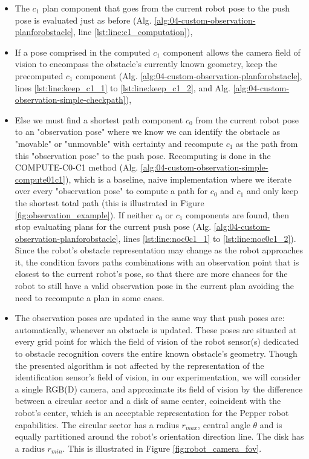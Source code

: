 \begin{itemize}
  \item The $c_{1}$ plan component that goes from the current robot pose to the push pose is evaluated just as before (Alg. \ref{alg:04-custom-observation-planforobstacle}, line \ref{lst:line:c1_computation}),
  \item If a pose comprised in the computed $c_{1}$ component allows the camera field of vision to encompass the obstacle's currently known geometry, keep the precomputed $c_{1}$ component (Alg. \ref{alg:04-custom-observation-planforobstacle}, lines \ref{lst:line:keep_c1_1} to \ref{lst:line:keep_c1_2}, and Alg. \ref{alg:04-custom-observation-simple-checkpath}),
  \item Else we must find a shortest path component $c_{0}$ from the current robot pose to an "observation pose" where we know we can identify the obstacle as "movable" or "unmovable" with certainty and recompute $c_{1}$ as the path from this "observation pose" to the push pose. Recomputing is done in the COMPUTE-C0-C1 method (Alg. \ref{alg:04-custom-observation-simple-compute01c1}), which is a baseline, naive implementation where we iterate over every "observation pose" to compute a path for $c_{0}$ and $c_{1}$ and only keep the shortest total path (this is illustrated in Figure \ref{fig:observation_example}). If neither $c_{0}$ or $c_{1}$ components are found, then stop evaluating plans for the current push pose (Alg. \ref{alg:04-custom-observation-planforobstacle}, lines \ref{lst:line:noc0c1_1} to \ref{lst:line:noc0c1_2}). Since the robot's obstacle representation may change as the robot approaches it, the condition favors paths combinations with an observation point that is closest to the current robot's pose, so that there are more chances for the robot to still have a valid observation pose in the current plan avoiding the need to recompute a plan in some cases.
  \item The observation poses are updated in the same way that push poses are: automatically, whenever an obstacle is updated. These poses are situated at every grid point for which the field of vision of the robot sensor(s) dedicated to obstacle recognition covers the entire known obstacle's geometry. Though the presented algorithm is not affected by the representation of the identification sensor's field of vision, in our experimentation, we will consider a single RGB(D) camera, and approximate its field of vision by the difference between a circular sector and a disk of same center, coincident with the robot's center, which is an acceptable representation for the Pepper robot capabilities. The circular sector has a radius $r_{max}$, central angle $\theta$ and is equally partitioned around the robot's orientation direction line. The disk has a radius $r_{min}$. This is illustrated in Figure \ref{fig:robot_camera_fov}.
\end{itemize}

